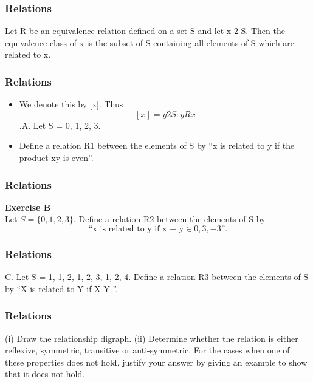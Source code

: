 \documentclass[Relations-MASTER.tex]{subfiles}
\begin{document}
	
\begin{frame}
	\frametitle{Relations}
	Let R be an equivalence relation defined on a set S and let x 2 S. 
Then the equivalence class of x is the subset of S containing all
elements of S which are related to x. 
\end{frame}
\begin{frame}
	\frametitle{Relations}
	\begin{itemize}
	\item We denote this by [x]. Thus
	\[[x] = {y 2 S : yRx}\].A. Let S = {0, 1, 2, 3}. 
	\item Define a relation R1 between the elements of S by
	“x is related to y if the product xy is even”.
	\end{itemize}


\end{frame}
\begin{frame}
	\frametitle{Relations}
\textbf{Exercise B}\\
Let $S = \{0, 1, 2, 3\}$. 
Define a relation R2 between the elements of S by
\[\mbox{“x is related to y if x − y} \in {0, 3,−3}”.\]
\end{frame}
\begin{frame}
	\frametitle{Relations}
C. Let S = {{1}, {1, 2}, {1, 2, 3}, {1, 2, 4}}. 
Define a relation R3 between
the elements of S by “X is related to Y if X \subseteq Y ”.
\end{frame}
\begin{frame}
	\frametitle{Relations}
(i) Draw the relationship digraph.
(ii) Determine whether the relation is either reflexive, symmetric, transitive
or anti-symmetric. For the cases when one of these properties
does not hold, justify your answer by giving an example to show that
it does not hold.
\end{frame}
\end{document}
